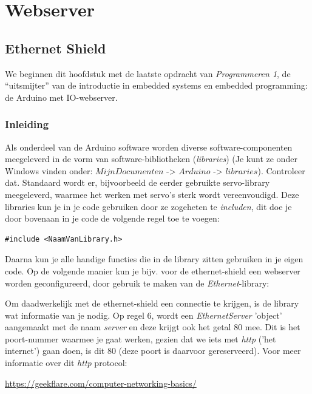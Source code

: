 \chapter{Webserver}

\section{Ethernet Shield}

We beginnen dit hoofdstuk met de laatste opdracht van \textit{Programmeren 1}, de “uitsmijter” van de introductie in embedded systems en embedded programming: de Arduino met IO-webserver.

\subsection*{Inleiding}
Als onderdeel van de Arduino software worden diverse software-componenten meegeleverd in de vorm van software-bibliotheken (\textit{libraries}) (Je kunt ze onder Windows vinden onder: $Mijn Documenten$ -> $Arduino$ -> $libraries$). Controleer dat. Standaard wordt er, bijvoorbeeld de eerder gebruikte servo-library meegeleverd, waarmee het werken met servo’s sterk wordt vereenvoudigd. Deze libraries kun je in je code gebruiken door ze zogeheten te \textit{includen}, dit doe je door bovenaan in je code de volgende regel toe te voegen:

\begin{lstlisting}[language=Arduino]
#include <NaamVanLibrary.h>
\end{lstlisting}

Daarna kun je alle handige functies die in de library zitten gebruiken in je eigen code. Op de volgende manier kun je bijv. voor de ethernet-shield een webserver worden geconfigureerd, door gebruik te maken van de \textit{Ethernet}-library:



Om daadwerkelijk met de ethernet-shield een connectie te krijgen, is de library wat informatie van je nodig. Op regel $6$, wordt een \textit{EthernetServer} 'object' aangemaakt met de naam \textit{server} en deze krijgt ook het getal $80$ mee. Dit is het poort-nummer waarmee je gaat werken, gezien dat we iets met \textit{http} ('het internet') gaan doen, is dit $80$ (deze poort is daarvoor gereserveerd). Voor meer informatie over dit \textit{http} protocol:

\url{https://geekflare.com/computer-networking-basics/}


